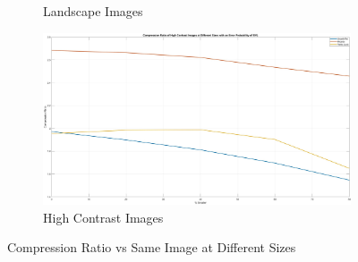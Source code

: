 \documentclass[landscape,a0paper,fontscale=0.4]{baposter} %
\begin{document}
\begin{poster}
{\begin{figure}[H]
\begin{subfigure}{0.3\textwidth}
		\caption{Landscape Images} %
	\end{subfigure}
	\begin{subfigure}{0.3\textwidth} %
		\includegraphics[scale=0.055]{HighContrastGraph}
		\caption{High Contrast Images} %
	\end{subfigure}
	\vspace{-2em}
	\caption{Compression Ratio vs Same Image at Different Sizes}
	\label{fig: CR} %
\end{figure}

}
\end{poster}
\end{document}
